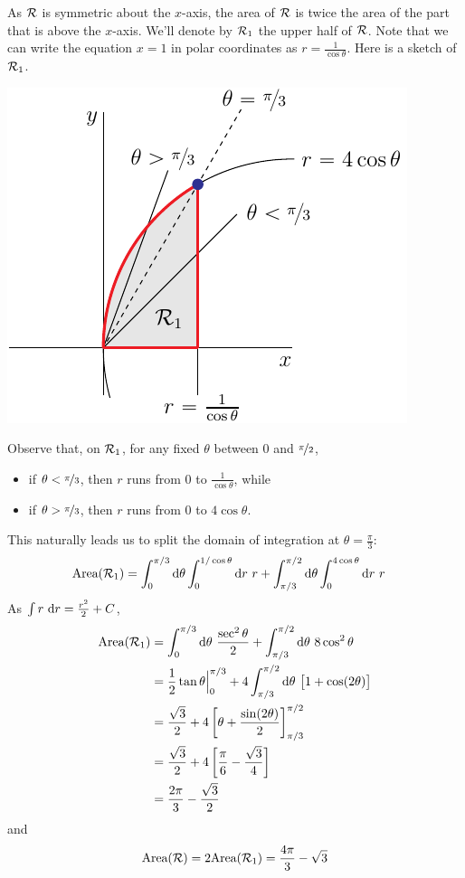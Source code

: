 \begin{eg}
As $\mathcal{R}$ is symmetric about the $x$-axis, the area of $\mathcal{R}$ is
twice the area of the part that is above the $x$-axis.
We'll denote by $\mathcal{R}_1$ the upper half of $\mathcal{R}$. Note that
we can write the equation $x=1$ in polar coordinates as 
$r=\frac{1}{\cos\theta}$. Here is a sketch of $\mathcal{R}_1$.
\begin{efig}
\begin{center}
    \includegraphics{comPolarB.pdf}
\end{center}
\end{efig}
Observe that, on $\mathcal{R}_1$, for any fixed $\theta$ between 
$0$ and $\nicefrac{\pi}{2}$,
\begin{itemize}
\item 
if $\theta<\nicefrac{\pi}{3}$, then $r$ runs from $0$ to 
$\frac{1}{\cos\theta}$, while

\item
if $\theta>\nicefrac{\pi}{3}$, then $r$ runs from $0$ to 
$4\cos\theta$.
\end{itemize}
This naturally leads us to split the domain of integration at $\theta
=\frac{\pi}{3}$:
\begin{align*}
\text{Area}(\mathcal{R}_1)& = 
     \int_0^{\pi/3}\mathrm{d}\theta\int_0^{1/\cos\theta}\mathrm{d}r\ r
     +\int_{\pi/3}^{\pi/2}\mathrm{d}\theta\int_0^{4\cos\theta}\mathrm{d}r\ r 
\end{align*}
As $\int r\ \dee{r}=\frac{r^2}{2}+C$, 
\begin{align*}
\text{Area}(\mathcal{R}_1)
&=\int_0^{\pi/3}\mathrm{d}\theta\ \frac{\sec^2\theta}{2}
   +\int_{\pi/3}^{\pi/2}\mathrm{d}\theta\ 8\cos^2\theta \\
&=\frac{1}{2}\tan\theta\Big|_0^{\pi/3}
      +4\int_{\pi/3}^{\pi/2}\mathrm{d}\theta\ \big[1+\cos(2\theta)\big] \\
&=\frac{\sqrt{3}}{2} +4\left[\theta+\frac{\sin(2\theta)}{2}\right]_{\pi/3}^{\pi/2} \\
&=\frac{\sqrt{3}}{2} +4\left[\frac{\pi}{6}-\frac{\sqrt{3}}{4}\right] \\
&=\frac{2\pi}{3}-\frac{\sqrt{3}}{2}
\end{align*}
and
\begin{align*}
\text{Area}(\mathcal{R})=2\text{Area}(\mathcal{R}_1) = \frac{4\pi}{3}-\sqrt{3}
\end{align*}
\end{eg}

